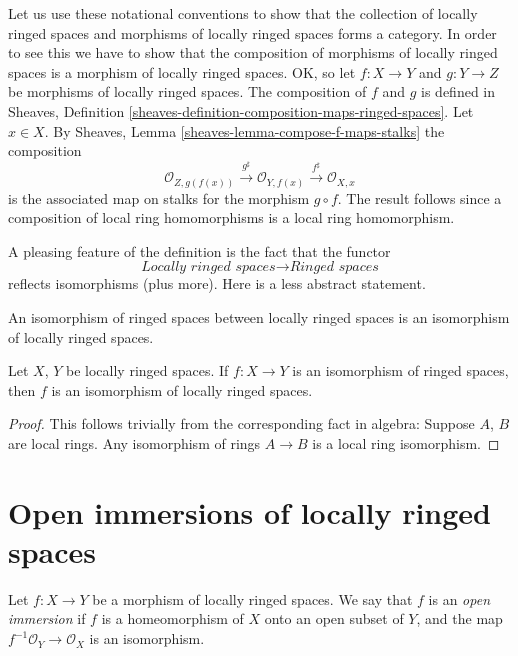 \medskip\noindent
Let us use these notational conventions to show that the
collection of locally ringed spaces and morphisms of locally
ringed spaces forms a category. In order to see this we have
to show that the composition of morphisms of locally ringed
spaces is a morphism of locally ringed spaces. OK, so let
$f : X \to Y$ and $g : Y \to Z$ be morphisms of locally
ringed spaces. The composition of $f$ and $g$ is defined in
Sheaves, Definition \ref{sheaves-definition-composition-maps-ringed-spaces}.
Let $x \in X$. By
Sheaves, Lemma \ref{sheaves-lemma-compose-f-maps-stalks}
the composition
$$
\mathcal{O}_{Z, g(f(x))}
\xrightarrow{g^\sharp}
\mathcal{O}_{Y, f(x)}
\xrightarrow{f^\sharp}
\mathcal{O}_{X, x}
$$
is the associated map on stalks for the morphism $g \circ f$.
The result follows since a composition of local ring
homomorphisms is a local ring homomorphism.

\medskip\noindent
A pleasing feature of the definition is the fact that the functor
$$
\textit{Locally ringed spaces}
\longrightarrow
\textit{Ringed spaces}
$$
reflects isomorphisms (plus more).
Here is a less abstract statement.

\begin{lemma}
\label{lemma-isomorphism-locally-ringed}
\begin{slogan}
An isomorphism of ringed spaces between locally ringed spaces is an
isomorphism of locally ringed spaces.
\end{slogan}
Let $X$, $Y$ be locally ringed spaces.
If $f : X \to Y$ is an isomorphism of
ringed spaces, then $f$ is an isomorphism
of locally ringed spaces.
\end{lemma}

\begin{proof}
This follows trivially from the corresponding fact in algebra:
Suppose $A$, $B$ are local rings. Any isomorphism of rings
$A \to B$ is a local ring isomorphism.
\end{proof}













\section{Open immersions of locally ringed spaces}
\label{section-open-immersion}

\begin{definition}
\label{definition-immersion-locally-ringed-spaces}
Let $f : X \to Y$ be a morphism of locally ringed spaces.
We say that $f$ is an {\it open immersion} if
$f$ is a homeomorphism of $X$ onto an open subset
of $Y$, and the map $f^{-1}\mathcal{O}_Y \to \mathcal{O}_X$
is an isomorphism.
\end{definition}

